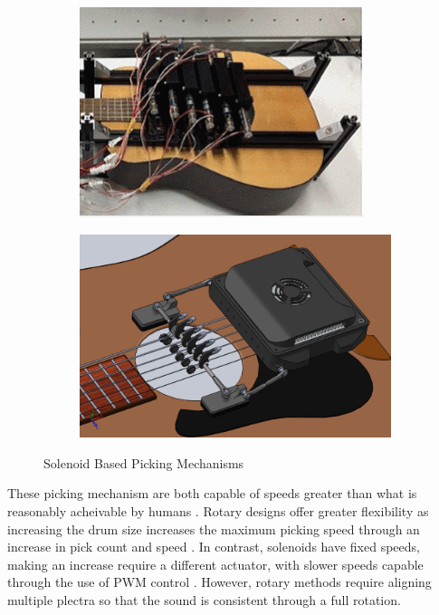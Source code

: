 \documentclass[12pt, a4paper, onecolumn]{IEEEtran}
\begin{document}
\begin{figure}[!h]
\begin{subfigure}{0.3\textwidth}
                \includegraphics[width=\columnwidth]{pwmSolenoid_picking.png}
                \label{fig:pwm_picking}
            \end{subfigure}
            \begin{subfigure}{0.3\textwidth}
                \includegraphics[width=\columnwidth]{pivotSolenoid_picking.png}
                \label{fig:pivot_picking}
            \end{subfigure}
            \caption{Solenoid Based Picking Mechanisms}
            \label{fig:SolenoidPicking}
        \end{figure}

        These picking mechanism are both capable of speeds greater than what is reasonably acheivable by humans \cite{pickspeed}. 
        Rotary designs offer greater flexibility as increasing the drum size increases the maximum picking speed through an increase in pick count and speed \cite{VUW_Chordophones,pickspeed}.
        In contrast, solenoids have fixed speeds, making an increase require a different actuator, with slower speeds capable through the use of PWM control \cite{PWM_Solenoid}.
        However, rotary methods require aligning multiple plectra so that the sound is consistent through a full rotation.
\end{document}
